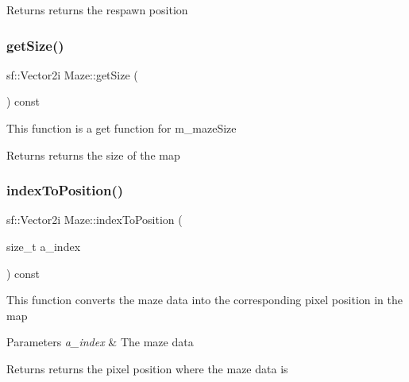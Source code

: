 \begin{DoxyReturn}{Returns}
returns the respawn position 
\end{DoxyReturn}
\mbox{\label{class_maze_a664b89e39391a1551babb93556cb36f8}} 
\subsubsection{\texorpdfstring{get\+Size()}{getSize()}}
{\footnotesize\ttfamily sf\+::\+Vector2i Maze\+::get\+Size (\begin{DoxyParamCaption}{ }\end{DoxyParamCaption}) const}

This function is a get function for m\+\_\+maze\+Size

\begin{DoxyReturn}{Returns}
returns the size of the map 
\end{DoxyReturn}
\mbox{\label{class_maze_ac256166dfc46cc089de0c998295dbc66}} 
\subsubsection{\texorpdfstring{index\+To\+Position()}{indexToPosition()}}
{\footnotesize\ttfamily sf\+::\+Vector2i Maze\+::index\+To\+Position (\begin{DoxyParamCaption}\item[{size\+\_\+t}]{a\+\_\+index }\end{DoxyParamCaption}) const\hspace{0.3cm}{\ttfamily [inline]}}

This function converts the maze data into the corresponding pixel position in the map


\begin{DoxyParams}{Parameters}
{\em a\+\_\+index} & The maze data \\
\hline
\end{DoxyParams}
\begin{DoxyReturn}{Returns}
returns the pixel position where the maze data is 
\end{DoxyReturn}
\mbox{\label{class_maze_a63fd7d817f664bb7b157db12479d89be}} 
